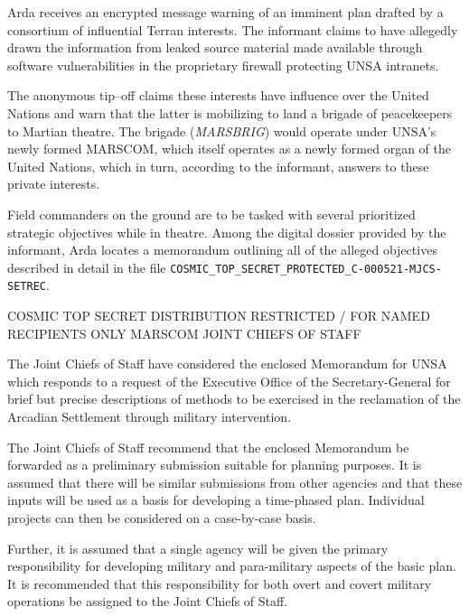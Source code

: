 Arda receives an encrypted message warning of an imminent plan drafted by a consortium of influential Terran interests. The informant claims to have allegedly drawn the information from leaked source material made available through software vulnerabilities in the proprietary firewall protecting UNSA intranets. 

The anonymous tip--off claims these interests have influence over the United Nations and warn that the latter is mobilizing to land a brigade of peacekeepers to Martian theatre. The brigade ({\it MARSBRIG}) would operate under UNSA's newly formed MARSCOM, which itself operates as a newly formed organ of the United Nations, which in turn, according to the informant, answers to these private interests.

Field commanders on the ground are to be tasked with several prioritized strategic objectives while in theatre. Among the digital dossier provided by the informant, Arda locates a memorandum outlining all of the alleged objectives described in detail in the file {\tt COSMIC_TOP_SECRET_PROTECTED_C-000521-MJCS-SETREC}.

\startTimelineCorrespondenceDocument
COSMIC TOP SECRET
DISTRIBUTION RESTRICTED / FOR NAMED RECIPIENTS ONLY
MARSCOM JOINT CHIEFS OF STAFF

\startitemize[n]
    
    \item The Joint Chiefs of Staff have considered the enclosed Memorandum for UNSA which responds to a request of the Executive Office of the Secretary-General for brief but precise descriptions of methods to be exercised in the reclamation of the Arcadian Settlement through military intervention.
    
    \item The Joint Chiefs of Staff recommend that the enclosed Memorandum be forwarded as a preliminary submission suitable for planning purposes. It is assumed that there will be similar submissions from other agencies and that these inputs will be used as a basis for developing a time-phased plan. Individual projects can then be considered on a case-by-case basis.
    
    \item Further, it is assumed that a single agency will be given the primary responsibility for developing military and para-military aspects of the basic plan. It is recommended that this responsibility for both overt and covert military operations be assigned to the Joint Chiefs of Staff.
    
